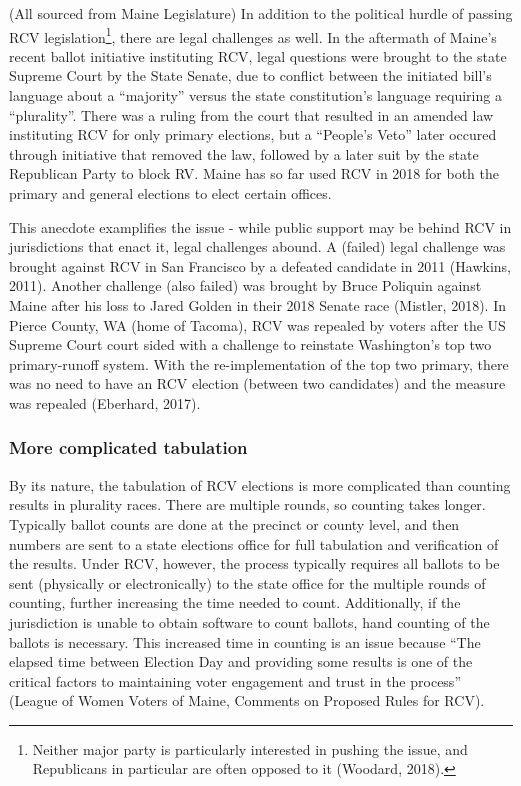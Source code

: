 \documentclass[12pt,twoside]{reedthesis}
\theoremstyle{definition}
\theoremstyle{definition}
\theoremstyle{definition}
\theoremstyle{remark}
\begin{document}
(All sourced from Maine Legislature) In addition to the political hurdle
of passing RCV legislation\footnote{Neither major party is particularly
  interested in pushing the issue, and Republicans in particular are
  often opposed to it (Woodard, 2018).}, there are legal challenges as
well. In the aftermath of Maine's recent ballot initiative instituting
RCV, legal questions were brought to the state Supreme Court by the
State Senate, due to conflict between the initiated bill's language
about a ``majority'' versus the state constitution's language requiring
a ``plurality''. There was a ruling from the court that resulted in an
amended law instituting RCV for only primary elections, but a ``People's
Veto'' later occured through initiative that removed the law, followed
by a later suit by the state Republican Party to block RV. Maine has so
far used RCV in 2018 for both the primary and general elections to elect
certain offices.

This anecdote examplifies the issue - while public support may be behind
RCV in jurisdictions that enact it, legal challenges abound. A (failed)
legal challenge was brought against RCV in San Francisco by a defeated
candidate in 2011 (Hawkins, 2011). Another challenge (also failed) was
brought by Bruce Poliquin against Maine after his loss to Jared Golden
in their 2018 Senate race (Mistler, 2018). In Pierce County, WA (home of
Tacoma), RCV was repealed by voters after the US Supreme Court court
sided with a challenge to reinstate Washington's top two primary-runoff
system. With the re-implementation of the top two primary, there was no
need to have an RCV election (between two candidates) and the measure
was repealed (Eberhard, 2017).

\hypertarget{more-complicated-tabulation}{%
\subsubsection{More complicated
tabulation}\label{more-complicated-tabulation}}

By its nature, the tabulation of RCV elections is more complicated than
counting results in plurality races. There are multiple rounds, so
counting takes longer. Typically ballot counts are done at the precinct
or county level, and then numbers are sent to a state elections office
for full tabulation and verification of the results. Under RCV, however,
the process typically requires all ballots to be sent (physically or
electronically) to the state office for the multiple rounds of counting,
further increasing the time needed to count. Additionally, if the
jurisdiction is unable to obtain software to count ballots, hand
counting of the ballots is necessary. This increased time in counting is
an issue because ``The elapsed time between Election Day and providing
some results is one of the critical factors to maintaining voter
engagement and trust in the process'' (League of Women Voters of Maine,
Comments on Proposed Rules for RCV).
\end{document}
